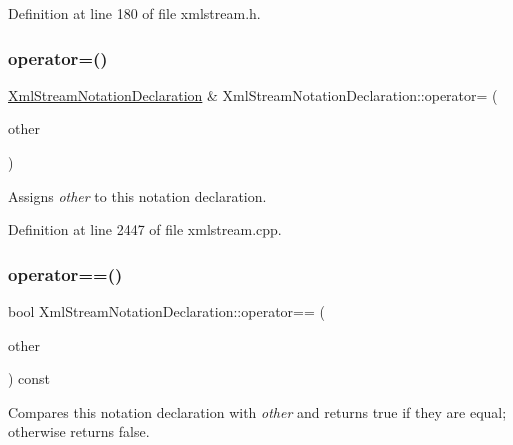 Definition at line 180 of file xmlstream.\+h.

\mbox{\label{class_xml_stream_notation_declaration_a3689e3063f5c7f21416d4c2b55913bbb}} 
\subsubsection{\texorpdfstring{operator=()}{operator=()}}
{\footnotesize\ttfamily \hyperlink{class_xml_stream_notation_declaration}{Xml\+Stream\+Notation\+Declaration} \& Xml\+Stream\+Notation\+Declaration\+::operator= (\begin{DoxyParamCaption}\item[{const \hyperlink{class_xml_stream_notation_declaration}{Xml\+Stream\+Notation\+Declaration} \&}]{other }\end{DoxyParamCaption})}

Assigns {\itshape other} to this notation declaration. 

Definition at line 2447 of file xmlstream.\+cpp.

\mbox{\label{class_xml_stream_notation_declaration_acd0f30e890e5a8d9d2f0889f5d80d65e}} 
\subsubsection{\texorpdfstring{operator==()}{operator==()}}
{\footnotesize\ttfamily bool Xml\+Stream\+Notation\+Declaration\+::operator== (\begin{DoxyParamCaption}\item[{const \hyperlink{class_xml_stream_notation_declaration}{Xml\+Stream\+Notation\+Declaration} \&}]{other }\end{DoxyParamCaption}) const\hspace{0.3cm}{\ttfamily [inline]}}

Compares this notation declaration with {\itshape other} and returns {\ttfamily true} if they are equal; otherwise returns {\ttfamily false}. 

